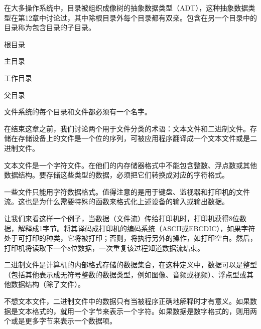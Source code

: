 在大多操作系统中，目录被组织成像树的抽象数据类型（ADT），这种抽象数据类型在第12章中讨论过，其中除根目录外每个目录都有双亲。包含在另一个目录中的目录称为包含目录的子目录。

根目录

主目录

工作目录

父目录

文件系统的每个目录和文件都必须有一个名字。

在结束这章之前，我们讨论两个用于文件分类的术语：文本文件和二进制文件。存储在存储设备上的文件是一个位的序列，可被应用程序翻译成一个文本文件或是二进制文件。

文本文件是一个字符文件。在他们的内存储器格式中不能包含整数、浮点数或其他数据结构。要存储这些类型的数据，必须把它们转换成对应的字符格式。

一些文件只能用字符数据格式。值得注意的是用于键盘、监视器和打印机的文件流。这也是为什么需要特殊的函数来格式化上述设备的输入或输出数据。

让我们来看这样一个例子，当数据（文件流）传给打印机时，打印机获得8位数据，解释成1字节。将其译码成打印机的编码系统（ASCII或EBCDIC），如果字符处于可打印的种类，它将被打印；否则，将执行另外的操作，如打印空白。然后，打印机将读取下一个8位数据，一次重复该过程知道数据流结束。

二进制文件是计算机的内部格式存储的数据集合，在这种定义中，数据可以是整型（包括其他表示成无符号整数的数据类型，例如图像、音频或视频）、浮点型或其他数据结构（除了文件）。

不想文本文件，二进制文件中的数据只有当被程序正确地解释时才有意义。如果数据是文本格式的，就用一个字节来表示一个字符。如果数据是数字格式的，则用两个或是更多字节来表示一个数据项。
